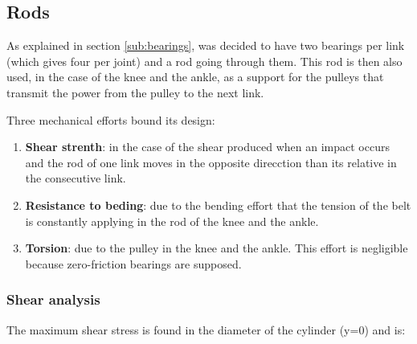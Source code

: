 \subsection{Rods} %
\label{sub:rods}
As explained in section \ref{sub:bearings}, was decided to have two bearings per link (which gives four per joint) and a rod going through them.
This rod is then also used, in the case of the knee and the ankle, as a support for the pulleys that transmit the power from the pulley to the next link.

Three mechanical efforts bound its design:
\begin{enumerate}
  \item \textbf{Shear strenth}: in the case of the shear produced when an impact occurs and the rod of one link moves in the opposite direcction than its relative in the consecutive link.
  \item \textbf{Resistance to beding}: due to the bending effort that the tension of the belt is constantly applying in the rod of the  knee and the ankle.
  \item \textbf{Torsion}: due to the pulley in the knee and the ankle. 
  This effort is negligible because zero-friction bearings are supposed.
\end{enumerate}

  \subsubsection{Shear analysis} %
  \label{ssub:shear_analysis}
  The maximum shear stress is found in the diameter of the cylinder (y=0) and is:
  
